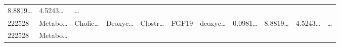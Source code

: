 \documentclass[
]{article}
\begin{document}
\begin{longtable}[]{@{}lllllllllll@{}}
\begin{minipage}[t]{0.07\columnwidth}
8.8819\ldots{}\strut
\end{minipage} & \begin{minipage}[t]{0.07\columnwidth}\raggedright
4.5243\ldots{}\strut
\end{minipage} & \begin{minipage}[t]{0.03\columnwidth}\raggedright
\ldots{}\strut
\end{minipage}\tabularnewline
\begin{minipage}[t]{0.05\columnwidth}\raggedright
222528\strut
\end{minipage} & \begin{minipage}[t]{0.07\columnwidth}\raggedright
Metabo\ldots{}\strut
\end{minipage} & \begin{minipage}[t]{0.07\columnwidth}\raggedright
Cholic\ldots{}\strut
\end{minipage} & \begin{minipage}[t]{0.09\columnwidth}\raggedright
Deoxyc\ldots{}\strut
\end{minipage} & \begin{minipage}[t]{0.07\columnwidth}\raggedright
Clostr\ldots{}\strut
\end{minipage} & \begin{minipage}[t]{0.07\columnwidth}\raggedright
FGF19\strut
\end{minipage} & \begin{minipage}[t]{0.09\columnwidth}\raggedright
deoxyc\ldots{}\strut
\end{minipage} & \begin{minipage}[t]{0.07\columnwidth}\raggedright
0.0981\ldots{}\strut
\end{minipage} & \begin{minipage}[t]{0.07\columnwidth}\raggedright
8.8819\ldots{}\strut
\end{minipage} & \begin{minipage}[t]{0.07\columnwidth}\raggedright
4.5243\ldots{}\strut
\end{minipage} & \begin{minipage}[t]{0.03\columnwidth}\raggedright
\ldots{}\strut
\end{minipage}\tabularnewline
\begin{minipage}[t]{0.05\columnwidth}\raggedright
222528\strut
\end{minipage} & \begin{minipage}[t]{0.07\columnwidth}\raggedright
Metabo\ldots{}\strut
\end{minipage} & \begin{minipage}[t]{0.07\columnwidth}\raggedright

\end{minipage}
\end{longtable}
\end{document}
